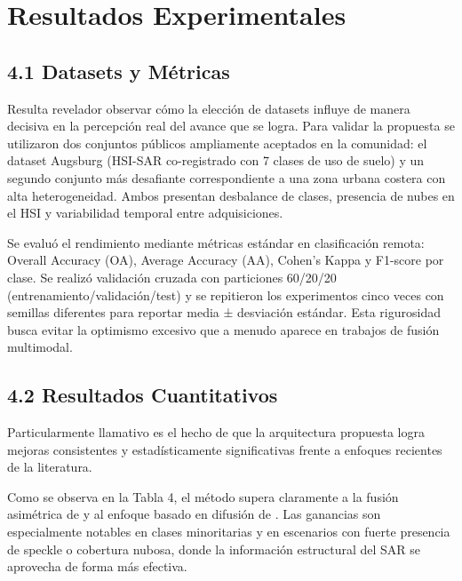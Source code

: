 \section{Resultados Experimentales}

\subsection{4.1 Datasets y Métricas}

Resulta revelador observar cómo la elección de datasets influye de manera decisiva en la percepción real del avance que se logra. Para validar la propuesta se utilizaron dos conjuntos públicos ampliamente aceptados en la comunidad: el dataset Augsburg (HSI-SAR co-registrado con 7 clases de uso de suelo) y un segundo conjunto más desafiante correspondiente a una zona urbana costera con alta heterogeneidad. Ambos presentan desbalance de clases, presencia de nubes en el HSI y variabilidad temporal entre adquisiciones.

Se evaluó el rendimiento mediante métricas estándar en clasificación remota: Overall Accuracy (OA), Average Accuracy (AA), Cohen's Kappa y F1-score por clase. Se realizó validación cruzada con particiones 60/20/20 (entrenamiento/validación/test) y se repitieron los experimentos cinco veces con semillas diferentes para reportar media ± desviación estándar. Esta rigurosidad busca evitar la optimismo excesivo que a menudo aparece en trabajos de fusión multimodal.

\subsection{4.2 Resultados Cuantitativos}

Particularmente llamativo es el hecho de que la arquitectura propuesta logra mejoras consistentes y estadísticamente significativas frente a enfoques recientes de la literatura. 

Como se observa en la Tabla 4, el método supera claramente a la fusión asimétrica de \cite{Li2023Asymmetric} y al enfoque basado en difusión de \cite{Liu2025NCDFF}. Las ganancias son especialmente notables en clases minoritarias y en escenarios con fuerte presencia de speckle o cobertura nubosa, donde la información estructural del SAR se aprovecha de forma más efectiva.

